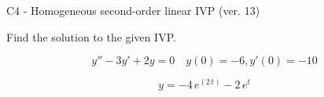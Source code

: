 \begin{exercise}
  \begin{exerciseTitle}C4 - Homogeneous second-order linear IVP (ver. 13)\end{exerciseTitle}
  \begin{exerciseStatement}
    
Find the solution to the given IVP.

    
\[y''-3y'+2y = 0 \hspace{1em} y(0) = -6 , y'(0) = -10\]

  \end{exerciseStatement}
  \begin{exerciseAnswer}
    
\[y= -4 \, e^{\left(2 \, t\right)} - 2 \, e^{t}\]

  \end{exerciseAnswer}
\end{exercise}